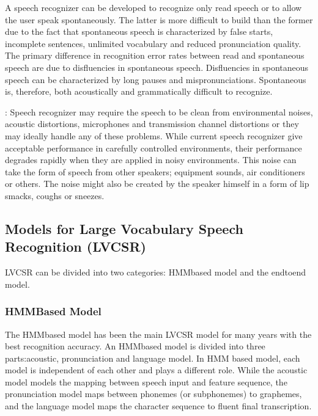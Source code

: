 \documentclass[letterpaper,10pt,english]{jupyterBook}
\begin{document}
\sphinxAtStartPar
{} A speech recognizer can be developed to recognize
only read speech or to allow the user speak spontaneously. The latter is
more difficult to build than the former due to the fact that spontaneous
speech is characterized by false starts, incomplete sentences, unlimited
vocabulary and reduced pronunciation quality. The primary difference in
recognition error rates between read and spontaneous speech are due to
disfluencies in spontaneous speech. Disfluencies in spontaneous speech
can be characterized by long pauses and mispronunciations. Spontaneous
is, therefore, both acoustically and grammatically difficult to
recognize.

\sphinxAtStartPar
{}: Speech recognizer may require the speech to be clean
from environmental noises, acoustic distortions, microphones and
transmission channel distortions or they may ideally handle any of these
problems. While current speech recognizer give acceptable performance in
carefully controlled environments, their performance degrades rapidly
when they are applied in noisy environments. This noise can take the
form of speech from other speakers; equipment sounds, air conditioners
or others. The noise might also be created by the speaker himself in a
form of lip smacks, coughs or sneezes.


\subsection{Models for Large Vocabulary Speech Recognition (LVCSR)}
\label{\detokenize{Recognition/Speech_Recognition:models-for-large-vocabulary-speech-recognition-lvcsr}}
\sphinxAtStartPar
LVCSR can be divided into two categories: HMM\sphinxhyphen{}based model and the
end\sphinxhyphen{}to\sphinxhyphen{}end model.


\subsubsection{HMM\sphinxhyphen{}Based Model}
\label{\detokenize{Recognition/Speech_Recognition:hmm-based-model}}
\sphinxAtStartPar
The HMM\sphinxhyphen{}based model has been the main LVCSR model for many years with
the best recognition accuracy. An HMM\sphinxhyphen{}based model is divided into three
parts:acoustic, pronunciation and language model. In HMM based model,
each model is independent of each other and plays a different role.
While the acoustic model models the mapping between speech input and
feature sequence, the pronunciation model maps between phonemes (or
sub\sphinxhyphen{}phonemes) to graphemes, and the language model maps the character
sequence to fluent final transcription.
\end{document}
